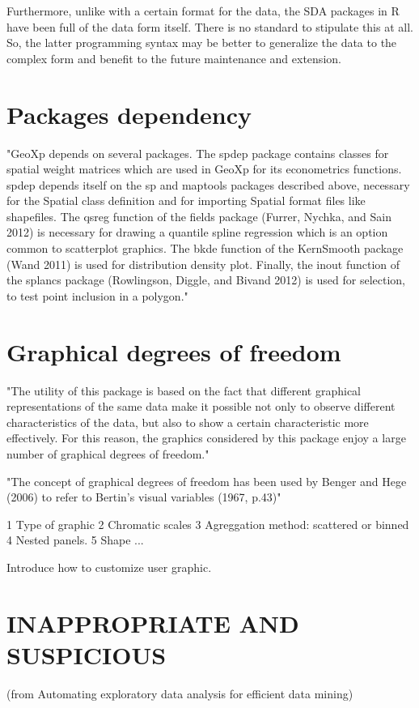 \documentclass[article]{jss}
\begin{document}
Furthermore, unlike  with a certain format for the data, the SDA packages in R have been full of the data form itself. There is no standard to stipulate this at all. So, the latter programming syntax may be better to generalize the data to the complex form and benefit to the future maintenance and extension.


\section*{Packages dependency}

"GeoXp depends on several packages. The spdep package contains classes for spatial weight
matrices which are used in GeoXp for its econometrics functions. spdep depends itself on
the sp and maptools packages described above, necessary for the Spatial class definition and
for importing Spatial format files like shapefiles. The qsreg function of the fields package
(Furrer, Nychka, and Sain 2012) is necessary for drawing a quantile spline regression which
is an option common to scatterplot graphics. The bkde function of the KernSmooth package
(Wand 2011) is used for distribution density plot. Finally, the inout function of the splancs
package (Rowlingson, Diggle, and Bivand 2012) is used for selection, to test point inclusion
in a polygon."




\section*{Graphical degrees of freedom}

"The utility of this package is based on the fact that different graphical representations of the
same data make it possible not only to observe different characteristics of the data, but also
to show a certain characteristic more effectively. For this reason, the graphics considered by
this package enjoy a large number of graphical degrees of freedom."

"The concept of graphical degrees of freedom has been used by Benger and Hege (2006) to refer to Bertin's visual variables (1967, p.43)"


1 Type of graphic
2 Chromatic scales
3 Agreggation method: scattered or binned
4 Nested panels.
5 Shape
...

Introduce how to customize user graphic.


\section*{INAPPROPRIATE AND SUSPICIOUS}
(from Automating exploratory data analysis for efficient data mining)
\end{document}

